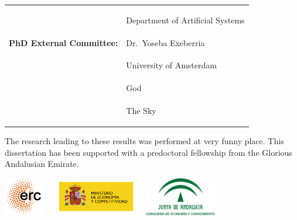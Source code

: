 {\begin{tabular}{@{}ll}
                                  & \begin{small}Department of Artificial Systems\end{small}\\[2mm]
\textbf{PhD External Committee:}  & Dr.~Yoseba Exeberria\\[0.8mm]
                                  & \begin{small}University of Amsterdam\end{small}\\[0.8mm]
                                  & God\\[0.8mm]
                                  & \begin{small}The Sky\end{small}\\[0.8mm]

\end{tabular}}
\begin{bottompar}
The research leading to these results was performed at very funny place.
This dissertation has been supported with a predoctoral fellowship from the Glorious Andalusian Emirate.
\begin{center}
\includegraphics[height=1.7cm]{title_and_cover/erc_logo.png}
\includegraphics[height=1.7cm]{title_and_cover/es_0.png}
\includegraphics[height=1.7cm]{title_and_cover/junta_consejeria1.eps}
\end{center}
\end{bottompar}

